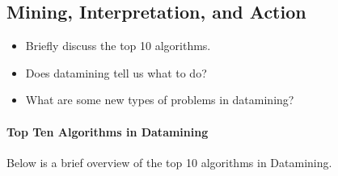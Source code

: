 \documentclass[fleqn,10pt]{SelfArx} %
\begin{document}
\subsection{Mining, Interpretation, and Action}

\begin{itemize}[noitemsep]
\item Briefly discuss the top 10 algorithms.
\item Does datamining tell us what to do?
\item What are some new types of problems in datamining?
\end{itemize}

\paragraph{Top Ten Algorithms in Datamining}
Below is a brief overview of the top 10 algorithms in Datamining. \cite{Wu:2007:TAD:1327434.1327436}
\end{document}
